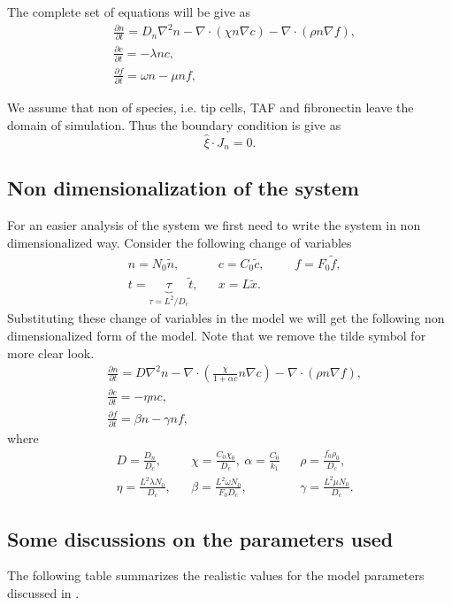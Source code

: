 \begin{summary}
	The complete set of equations will be give as
	\begin{align*}
		&\frac{\partial n}{\partial t} =  D_n\nabla^2 n  - \nabla\cdot(\chi n\nabla c) - \nabla\cdot(\rho n \nabla f), \\
		&\frac{\partial c}{\partial t} = -\lambda n c, \\
		&\frac{\partial f}{\partial t} = \omega n - \mu n f,
	\end{align*}
\end{summary}
\begin{remark}
	We assume that non of species, i.e. tip cells, TAF and fibronectin leave the domain of simulation. Thus the boundary condition is give as 
	\[ \hat{\xi} \cdot J_n = 0. \]
\end{remark}

\subsection{Non dimensionalization of the system}
For an easier analysis of the system we first need to write the system in non dimensionalized way. Consider the following change of variables
\begin{align*}
	& n = N_0 \tilde{n}, && c = C_0 \tilde{c}, &&& f = F_0\tilde{f}, \\
	& t = \underbrace{\tau}_{\tau = L^2/D_c} \tilde{t}, && x = L \tilde{x}.
\end{align*}
Substituting these change of variables in the model we will get the following non dimensionalized form of the model. Note that we remove the tilde symbol for more clear look.
\begin{align*}
	&\frac{\partial n}{\partial t} = D \nabla^2 n - \nabla\cdot(\frac{\chi}{1+\alpha c} n\nabla c) - \nabla\cdot(\rho n \nabla f), \\
	&\frac{\partial c}{\partial t} = -\eta n c, \\
	&\frac{\partial f}{\partial t} = \beta n - \gamma n f,
\end{align*}
where 
\begin{align*}
	& D = \frac{D_n}{D_c}, && \chi = \frac{C_0\chi_0}{D_c},\ \alpha = \frac{C_0}{k_1} && \rho = \frac{f_0\rho_0}{D_c},\\
	& \eta = \frac{L^2\lambda N_0}{D_c}, && \beta = \frac{L^2\omega N_0}{F_0 D_c}, && \gamma = \frac{L^2\mu N_0}{D_c}.
\end{align*}

\subsection{Some discussions on the parameters used}
The following table summarizes the realistic values for the model parameters discussed in \cite{Anderson1998}.

